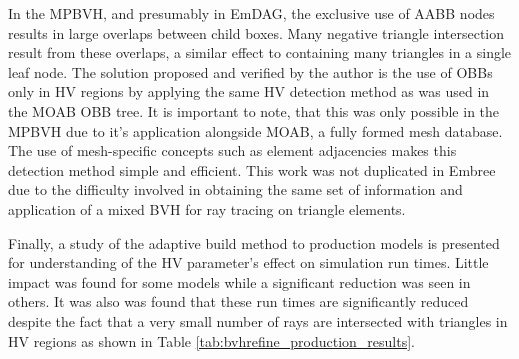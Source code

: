 In the MPBVH, and presumably in EmDAG, the exclusive use of AABB nodes results
in large overlaps between child boxes. Many negative triangle intersection
result from these overlaps, a similar effect to containing many
triangles in a single leaf node. The solution proposed and verified by the
author is the use of OBBs only in HV regions by applying the same HV detection
method as was used in the MOAB OBB tree. It is important to note, that this was
only possible in the MPBVH due to it's application alongside MOAB, a fully
formed mesh database. The use of mesh-specific concepts such as element
adjacencies makes this detection method simple and efficient. This work was not
duplicated in Embree due to the difficulty involved in obtaining the same set of
information and application of a mixed BVH for ray tracing on triangle elements.

Finally, a study of the adaptive build method to production models is presented
for understanding of the HV parameter's effect on simulation run times. Little
impact was found for some models while a significant reduction was seen in
others. It was also was found that these run times are significantly reduced
despite the fact that a very small number of rays are intersected with triangles
in HV regions as shown in Table \ref{tab:bvhrefine_production_results}.
